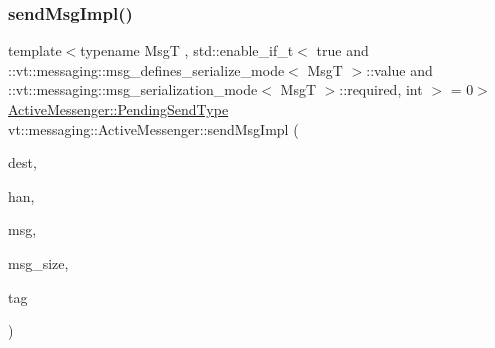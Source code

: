 \subsubsection{\texorpdfstring{send\+Msg\+Impl()}{sendMsgImpl()}\hspace{0.1cm}{\footnotesize\ttfamily [2/4]}}
{\footnotesize\ttfamily template$<$typename MsgT , std\+::enable\+\_\+if\+\_\+t$<$ true and \+::vt\+::messaging\+::msg\+\_\+defines\+\_\+serialize\+\_\+mode$<$ Msg\+T $>$\+::value and \+::vt\+::messaging\+::msg\+\_\+serialization\+\_\+mode$<$ Msg\+T $>$\+::required, int $>$  = 0$>$ \\
\hyperlink{structvt_1_1messaging_1_1_active_messenger_a3626a6ca76d8ad4ec7c3b47a2c70d3a8}{Active\+Messenger\+::\+Pending\+Send\+Type} vt\+::messaging\+::\+Active\+Messenger\+::send\+Msg\+Impl (\begin{DoxyParamCaption}\item[{\hyperlink{namespacevt_a866da9d0efc19c0a1ce79e9e492f47e2}{Node\+Type}}]{dest,  }\item[{\hyperlink{namespacevt_af64846b57dfcaf104da3ef6967917573}{Handler\+Type}}]{han,  }\item[{\hyperlink{structvt_1_1messaging_1_1_msg_shared_ptr}{Msg\+Shared\+Ptr}$<$ MsgT $>$ \&}]{msg,  }\item[{\hyperlink{namespacevt_aab8d55968084610ce3b17057981e9300}{Byte\+Type}}]{msg\+\_\+size,  }\item[{\hyperlink{namespacevt_a84ab281dae04a52a4b243d6bf62d0e52}{Tag\+Type}}]{tag }\end{DoxyParamCaption})\hspace{0.3cm}{\ttfamily [inline]}}

\mbox{\label{structvt_1_1messaging_1_1_active_messenger_ae4d52bd4014fe9cfee3a60bf477fe998}} 
